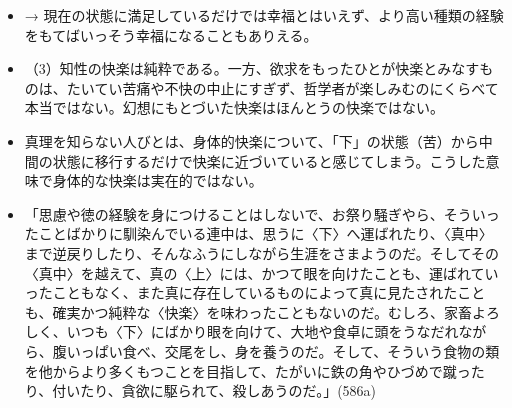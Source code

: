 \documentclass[dvipdfmx]{bxjsarticle}
\begin{document}
\begin{itemize}
\item → 現在の状態に満足しているだけでは幸福とはいえず、より高い種類の経験をもてばいっそう幸福になることもありえる。

\item （3）知性の快楽は純粋である。一方、欲求をもったひとが快楽とみなすものは、たいてい苦痛や不快の中止にすぎず、哲学者が楽しみむのにくらべて本当ではない。幻想にもとづいた快楽はほんとうの快楽ではない。

\item 真理を知らない人びとは、身体的快楽について、「下」の状態（苦）から中間の状態に移行するだけで快楽に近づいていると感じてしまう。こうした意味で身体的な快楽は実在的ではない。

\item 「思慮や徳の経験を身につけることはしないで、お祭り騒ぎやら、そういったことばかりに馴染んでいる連中は、思うに〈下〉へ運ばれたり、〈真中〉まで逆戻りしたり、そんなふうにしながら生涯をさまようのだ。そしてその〈真中〉を越えて、真の〈上〉には、かつて眼を向けたことも、運ばれていったこともなく、また真に存在しているものによって真に見たされたことも、確実かつ純粋な〈快楽〉を味わったこともないのだ。むしろ、家畜よろしく、いつも〈下〉にばかり眼を向けて、大地や食卓に頭をうなだれながら、腹いっぱい食べ、交尾をし、身を養うのだ。そして、そういう食物の類を他からより多くもつことを目指して、たがいに鉄の角やひづめで蹴ったり、付いたり、貪欲に駆られて、殺しあうのだ。」(586a)

\end{itemize}


\nocite{プラトン田中66:国家}
\nocite{プラトン藤沢66:ゴルギアス}
\nocite{norman98:_moral_philos}
\nocite{macintyre67:_short_histor_of_ethic}
  


\end{document}
